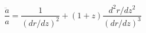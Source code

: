 \begin{equation}
 \frac{\ddot{a}}{a}=\frac{1}{(dr/dz)^2}+(1+z)\frac{d^2r/dz^2}{(dr/dz)^3}
\end{equation}

